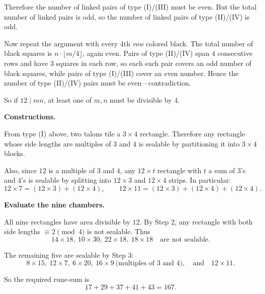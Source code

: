 Therefore the number of linked pairs of type (I)/(III) must be even.
But the total number of linked pairs is odd, so the number of linked pairs of type (II)/(IV) is odd.

Now repeat the argument with every $4$th \emph{row} colored black.
The total number of black squares is $n\cdot\lfloor m/4\rfloor$, again even.
Pairs of type (II)/(IV) span $4$ consecutive rows and have $3$ squares in each row, so each such pair covers an odd number of black squares,
while pairs of type (I)/(III) cover an even number.
Hence the number of type (II)/(IV) pairs must be even---contradiction.

So if $12\mid mn$, at least one of $m,n$ must be divisible by $4$.

\textbf{Constructions.}

From type (I) above, two talons tile a $3\times4$ rectangle.
Therefore any rectangle whose side lengths are multiples of $3$ and $4$ is sealable by partitioning it into $3\times4$ blocks.

Also, since $12$ is a multiple of $3$ and $4$, any $12\times t$ rectangle with $t$ a sum of $3$'s and $4$'s is sealable by splitting into $12\times3$ and $12\times4$ strips.
In particular:
\[
12\times7=(12\times3)+(12\times4),\qquad
12\times11=(12\times3)+(12\times4)+(12\times4).
\]

\textbf{Evaluate the nine chambers.}

All nine rectangles have area divisible by $12$.
By Step 2, any rectangle with both side lengths $\equiv 2\pmod4$ is not sealable.
Thus
\[
14\times18,\ 10\times30,\ 22\times18,\ 18\times18\quad\text{are not sealable.}
\]

The remaining five are sealable by Step 3:
\[
8\times15,\ 12\times7,\ 6\times20,\ 16\times9\ \text{(multiples of $3$ and $4$)},\quad\text{and}\quad 12\times11.
\]

So the required rune-sum is
\[
17+29+37+41+43=167.
\]


\NextPage